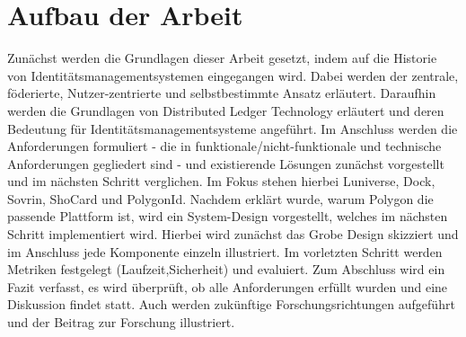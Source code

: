 \section{Aufbau der Arbeit}
Zunächst werden die Grundlagen dieser Arbeit gesetzt, indem auf die Historie von Identitätsmanagementsystemen eingegangen wird. Dabei werden der zentrale, föderierte, Nutzer-zentrierte und selbstbestimmte Ansatz erläutert. Daraufhin werden die Grundlagen von Distributed Ledger Technology erläutert und deren Bedeutung für Identitätsmanagementsysteme angeführt. Im Anschluss werden die Anforderungen formuliert - die in funktionale/nicht-funktionale und technische Anforderungen gegliedert sind - und existierende Lösungen zunächst vorgestellt und im nächsten Schritt verglichen. Im Fokus stehen hierbei Luniverse, Dock, Sovrin, ShoCard und PolygonId. Nachdem erklärt wurde, warum Polygon die passende Plattform ist, wird ein System-Design vorgestellt, welches im nächsten Schritt implementiert wird. Hierbei wird zunächst das Grobe Design skizziert und im Anschluss jede Komponente einzeln illustriert. Im vorletzten Schritt werden Metriken festgelegt (Laufzeit,Sicherheit) und evaluiert. Zum Abschluss wird ein Fazit verfasst, es wird überprüft, ob alle Anforderungen erfüllt wurden und eine Diskussion findet statt. Auch werden zukünftige Forschungsrichtungen aufgeführt und der Beitrag zur Forschung illustriert.